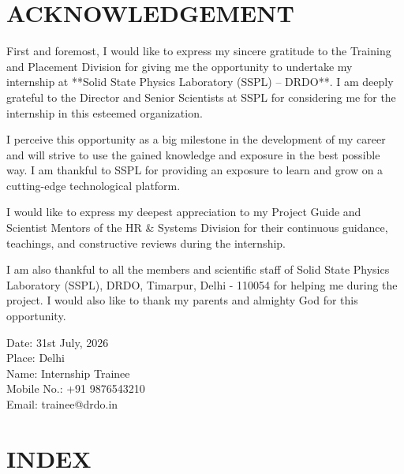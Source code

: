 \documentclass[12pt,a4paper]{article}
\begin{document}
\newpage
{}
\setcounter{page}{2}

\section*{ACKNOWLEDGEMENT}
\vspace{0.8cm}

First and foremost, I would like to express my sincere gratitude to the Training and Placement Division for giving me the opportunity to undertake my internship at **Solid State Physics Laboratory (SSPL) -- DRDO**. I am deeply grateful to the Director and Senior Scientists at SSPL for considering me for the internship in this esteemed organization.

I perceive this opportunity as a big milestone in the development of my career and will strive to use the gained knowledge and exposure in the best possible way. I am thankful to SSPL for providing an exposure to learn and grow on a cutting-edge technological platform.

I would like to express my deepest appreciation to my Project Guide and Scientist Mentors of the HR \& Systems Division for their continuous guidance, teachings, and constructive reviews during the internship.

I am also thankful to all the members and scientific staff of Solid State Physics Laboratory (SSPL), DRDO, Timarpur, Delhi - 110054 for helping me during the project. I would also like to thank my parents and almighty God for this opportunity.

\vspace{3.5cm}

\noindent
Date: 31st July, 2026\\[0.1cm]
Place: Delhi\\[0.3cm]
Name: Internship Trainee\\[0.1cm]
Mobile No.: +91 9876543210\\[0.1cm]
Email: trainee@drdo.in

\newpage
\section*{INDEX}
\vspace{0.8cm}
\end{document}
